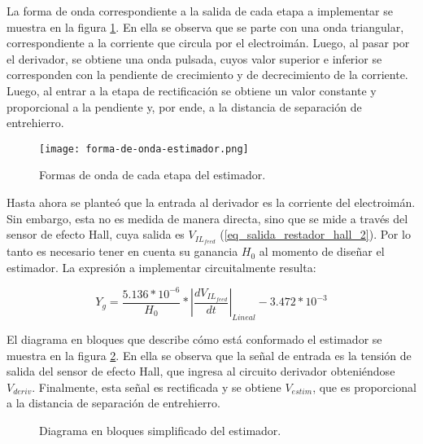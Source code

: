 La forma de onda correspondiente a la salida de cada etapa a implementar se muestra en la figura \ref{fig:img_forma-de-onda-estimador}. En ella se observa que se parte con una onda triangular, correspondiente a la corriente que circula por el electroimán. Luego, al pasar por el derivador, se obtiene una onda pulsada, cuyos valor superior e inferior se corresponden con la pendiente de crecimiento y de decrecimiento de la corriente. Luego, al entrar a la etapa de rectificación se obtiene un valor constante y proporcional a la pendiente y, por ende, a la distancia de separación de entrehierro.


\begin{figure}[H]
	\centering
	\texttt{[image: forma-de-onda-estimador.png]}
	\caption{Formas de onda de cada etapa del estimador.}
	\label{fig:img_forma-de-onda-estimador}
\end{figure}



Hasta ahora se planteó que la entrada al derivador es la corriente del electroimán. Sin embargo, esta no es medida de manera directa, sino que se mide a través del sensor de efecto Hall, cuya salida es $V_{IL_{feed}}$ (\ref{eq_salida_restador_hall_2}). Por lo tanto es necesario tener en cuenta su ganancia $H_0$ al momento de diseñar el estimador. La expresión a implementar circuitalmente resulta:

\begin{equation} \label{eq_Yg_salida_sensor}
	Y_g=\frac{5.136*10^{-6}}{H_0}*{\left|\frac{dV_{IL_{feed}}}{dt}\right|}_{Lineal} - 3.472*10^{-3}
\end{equation}

El diagrama en bloques que describe cómo está conformado el estimador se muestra en la figura \ref{fig:img_diag-en-bloques_estimador}. En ella se observa que la señal de entrada es la tensión de salida del sensor de efecto Hall, que ingresa al circuito derivador obteniéndose $V_{deriv}$. Finalmente, esta señal es rectificada y se obtiene $V_{estim}$, que es proporcional a la distancia de separación de entrehierro.

\begin{figure}[H]
	\centering
	
	\caption{Diagrama en bloques simplificado del estimador.}	\label{fig:img_diag-en-bloques_estimador}
\end{figure}

